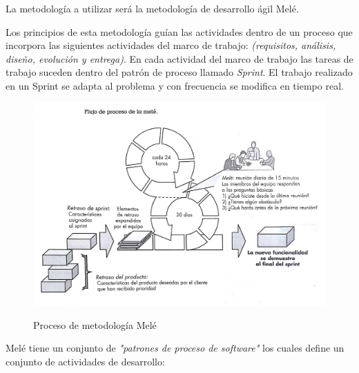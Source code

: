 

La metodología a utilizar será la metodología de desarrollo ágil Melé. \cite{7}

Los principios de esta metodología guían las actividades dentro de un proceso que incorpora las siguientes actividades del marco de trabajo: \emph{(requisitos, análisis, diseño, evolución y entrega)}. En cada actividad del marco de trabajo las tareas de trabajo suceden dentro del patrón de proceso llamado \emph{Sprint}. El trabajo realizado en un Sprint se adapta al problema y con frecuencia se modifica en tiempo real.

\begin{figure}[!hb]
	\includegraphics[width=\textwidth]{Imagenes/mele.jpg}
	\label{}
	\caption{Proceso de metodología Melé}
\end{figure}

Melé tiene un conjunto de \emph{"patrones de proceso de software"} los cuales define un conjunto de actividades de desarrollo:

